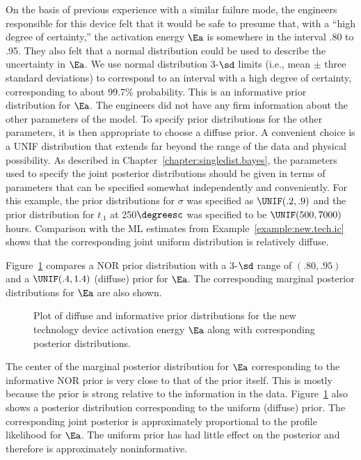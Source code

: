 On the basis of previous experience with a similar failure mode, the
engineers responsible for this device felt that it would be safe to
presume that, with a ``high degree of certainty,'' the activation energy
$\Ea$ is somewhere in the interval .80 to .95. They also felt that a
normal distribution could be used to describe the uncertainty in
$\Ea$. We use normal distribution 3-$\sd$ limits (i.e., mean $\pm$
three standard deviations) to correspond to an interval with a
high degree of certainty, corresponding to about 99.7\%
probability. This is an informative prior distribution for
$\Ea$. The engineers did not have any firm information about the
other parameters of the model. To specify prior distributions for
the other parameters, it is then appropriate to choose a diffuse
prior. A convenient choice is a UNIF distribution that extends far
beyond the range of the data and physical possibility. As
described in Chapter~\ref{chapter:singledist.bayes}, the parameters
used to specify the joint posterior distributions should be given in
terms of parameters that can be specified somewhat independently and
conveniently. For this example, the prior distributions for $\sigma$
was specified as $\UNIF(.2,.9)$ and the prior distribution for
$t_{.1}$ at 250$\degreesc$ was specified to be $\UNIF(500,7000)$
hours. Comparison with the ML estimates from
Example~\ref{example:new.tech.ic} shows that the corresponding joint
uniform distribution is relatively diffuse.

Figure~\ref{figure:nt.device.Ea.dist.ps} compares a NOR prior
distribution with a 3-$\sd$ range of $(.80,.95)$ and a
$\UNIF(.4,1.4)$ (diffuse) prior for $\Ea$. The corresponding marginal
posterior distributions for $\Ea$ are also shown. 
\begin{figure}
\caption{Plot of diffuse and informative prior 
distributions for the new technology device activation energy $\Ea$
along with corresponding posterior distributions.}
\label{figure:nt.device.Ea.dist.ps}
\end{figure}
The center of the marginal posterior distribution for $\Ea$
corresponding to the informative NOR prior is very close to that of
the prior itself. This is mostly because the prior is strong
relative to the information in the data.
Figure~\ref{figure:nt.device.Ea.dist.ps} also shows a posterior
distribution corresponding to the uniform (diffuse) prior. The
corresponding joint posterior is approximately proportional to the
profile likelihood for $\Ea$. The uniform prior has had little
effect on the posterior and therefore is approximately
noninformative.

